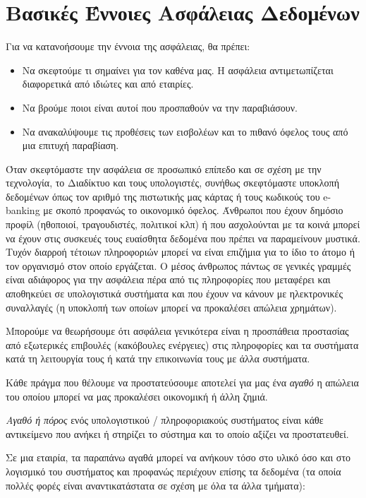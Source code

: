 %
%
\section{Βασικές Έννοιες Ασφάλειας Δεδομένων}

Για να κατανοήσουμε την έννοια της ασφάλειας, θα πρέπει:

\begin{itemize}
\item Να σκεφτούμε τι σημαίνει για τον καθένα μας. Η ασφάλεια αντιμετωπίζεται διαφορετικά από ιδιώτες και από εταιρίες.
\item Να βρούμε ποιοι είναι αυτοί που προσπαθούν να την παραβιάσουν.
\item Να ανακαλύψουμε τις προθέσεις των εισβολέων και το πιθανό όφελος τους από μια επιτυχή παραβίαση.
\end{itemize}

Όταν σκεφτόμαστε την ασφάλεια σε προσωπικό επίπεδο και σε σχέση με την τεχνολογία, το Διαδίκτυο και τους υπολογιστές, συνήθως σκεφτόμαστε υποκλοπή δεδομένων όπως τον αριθμό της πιστωτικής μας κάρτας ή τους κωδικούς του e-banking με σκοπό προφανώς το οικονομικό όφελος. Άνθρωποι που έχουν δημόσιο προφίλ (ηθοποιοί, τραγουδιστές, πολιτικοί κλπ) ή που ασχολούνται με τα κοινά μπορεί να έχουν στις συσκευές τους ευαίσθητα δεδομένα που πρέπει να παραμείνουν μυστικά. Τυχόν διαρροή τέτοιων πληροφοριών μπορεί να είναι επιζήμια για το ίδιο το άτομο ή τον οργανισμό στον οποίο εργάζεται. Ο μέσος άνθρωπος πάντως σε γενικές γραμμές είναι αδιάφορος για την ασφάλεια πέρα από τις πληροφορίες που μεταφέρει και αποθηκεύει σε υπολογιστικά συστήματα και που έχουν να κάνουν με ηλεκτρονικές συναλλαγές (η υποκλοπή των οποίων μπορεί να προκαλέσει απώλεια χρημάτων).

Μπορούμε να θεωρήσουμε ότι ασφάλεια γενικότερα είναι η προσπάθεια προστασίας από εξωτερικές επιβουλές (κακόβουλες ενέργειες) στις πληροφορίες και τα συστήματα κατά τη λειτουργία τους ή κατά την επικοινωνία τους με άλλα συστήματα. 

Κάθε πράγμα που θέλουμε να προστατεύσουμε αποτελεί για μας ένα \emph{αγαθό} η απώλεια του οποίου μπορεί να μας προκαλέσει οικονομική ή άλλη ζημιά. 

\emph{Αγαθό ή πόρος} ενός υπολογιστικού / πληροφοριακούς συστήματος είναι κάθε αντικείμενο που ανήκει ή στηρίζει το σύστημα και το οποίο αξίζει να προστατευθεί.

Σε μια εταιρία, τα παραπάνω αγαθά μπορεί να ανήκουν τόσο στο υλικό όσο και στο λογισμικό του συστήματος και προφανώς περιέχουν επίσης τα δεδομένα (τα οποία πολλές φορές είναι αναντικατάστατα σε σχέση με όλα τα άλλα τμήματα):

